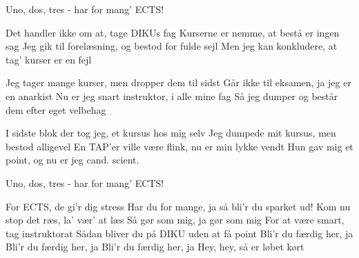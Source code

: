


Uno, dos, tres - har for mang' ECTS!

Det handler ikke om at, tage DIKUs fag
Kurserne er nemme, at bestå er ingen sag
Jeg gik til forelæsning, og bestod for fulde sejl
Men jeg kan konkludere, at tag' kurser er en fejl


Jeg tager mange kurser, men dropper dem til sidst
Går ikke til eksamen, ja jeg er en anarkist
Nu er jeg snart instruktor, i alle mine fag
Så jeg dumper og består dem efter eget velbehag


I sidste blok der tog jeg, et kursus hos mig selv
Jeg dumpede mit kursus, men bestod alligevel
En TAP'er ville være flink, nu er min lykke vendt
Hun gav mig et point, og nu er jeg cand. scient.


Uno, dos, tres - har for mang' ECTS!

For ECTS, de gi'r dig stress
Har du for mange, ja så bli'r du sparket ud!
Kom nu stop det ræs, la' vær' at læs
Så gør som mig, ja gør som mig
For at være smart, tag instruktorat
Sådan bliver du på DIKU uden at få point
Bli'r du færdig her, ja
Bli'r du færdig her, ja
Bli'r du færdig her, ja
Hey, hey, så er løbet kørt